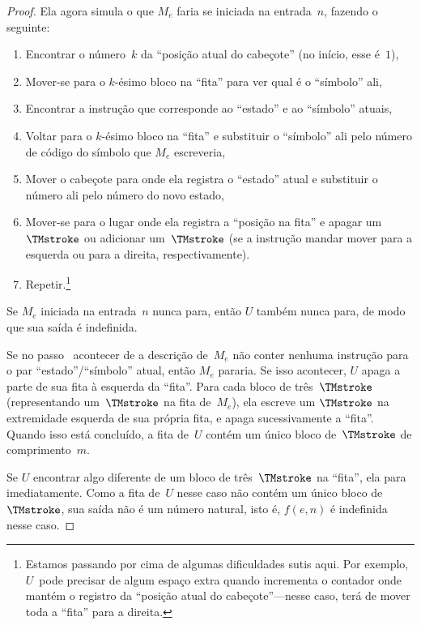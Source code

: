 \documentclass[../../../include/open-logic-section]{subfiles}
\begin{document}
\begin{proof}
  Ela agora simula o que $M_e$ faria se iniciada na entrada~$n$,
  fazendo o seguinte:
  \begin{enumerate}
    \item Encontrar o número~$k$ da ``posição atual do cabeçote'' (no
    início, esse é~$1$),
    \item Mover-se para o $k$-ésimo bloco na ``fita'' para ver qual é o
    ``símbolo'' ali,
    \item{}%
    Encontrar a instrução que corresponde ao ``estado'' e ao
    ``símbolo'' atuais,
    \item Voltar para o $k$-ésimo bloco na ``fita'' e substituir o
    ``símbolo'' ali pelo número de código do símbolo que $M_e$
    escreveria,
    \item Mover o cabeçote para onde ela registra o ``estado'' atual e
    substituir o número ali pelo número do novo estado,
    \item Mover-se para o lugar onde ela registra a ``posição na fita''
    e apagar um~$\TMstroke$ ou adicionar um~$\TMstroke$ (se a instrução
    mandar mover para a esquerda ou para a direita, respectivamente).
    \item Repetir.\footnote{Estamos passando por cima de algumas
    dificuldades sutis aqui. Por exemplo, $U$~pode precisar de algum
    espaço extra quando incrementa o contador onde mantém o registro
    da ``posição atual do cabeçote''---nesse caso, terá de mover toda
    a ``fita'' para a direita.}
  \end{enumerate}
  Se $M_e$ iniciada na entrada~$n$ nunca para, então $U$ também nunca
  para, de modo que sua saída é indefinida.

  Se no passo~ acontecer de a descrição de~$M_e$ não
  conter nenhuma instrução para o par ``estado''/``símbolo'' atual,
  então $M_e$ pararia. Se isso acontecer, $U$ apaga a parte de sua
  fita à esquerda da ``fita''. Para cada bloco de três~$\TMstroke$
  (representando um~$\TMstroke$ na fita de~$M_e$), ela escreve um
  $\TMstroke$ na extremidade esquerda de sua própria fita, e apaga
  sucessivamente a ``fita''. Quando isso está concluído, a fita de~$U$
  contém um único bloco de~$\TMstroke$ de comprimento~$m$.
  
  Se $U$ encontrar algo diferente de um bloco de três~$\TMstroke$ na
  ``fita'', ela para imediatamente. Como a fita de~$U$ nesse caso não
  contém um único bloco de~$\TMstroke$, sua saída não é um número
  natural, isto é, $f(e,n)$ é indefinida nesse caso.
\end{proof}
\end{document}
